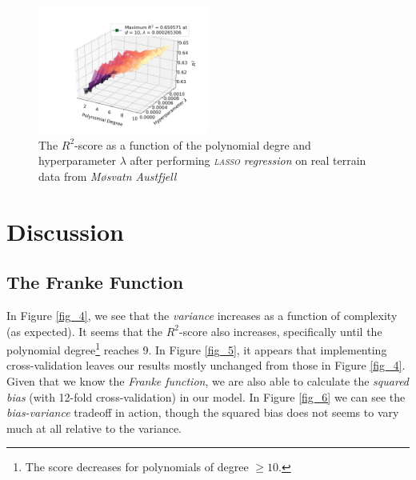 \documentclass[a4paper,10pt,english]{article}
\begin{document}
\begin{multicols*}{2}
\begin{figure}[H]
	\centering 
	\includegraphics[width = 0.5\textwidth, center]{../real_output/part_E_3.png}
	\caption{The $R^2$-score as a function of the polynomial degre and hyperparameter $\lambda$ after performing \textit{\textsc{lasso} regression} on real terrain data from \textit{Møsvatn Austfjell}}
	\label{fig_24}
\end{figure}

\section*{Discussion}
\label{sec:discussion}

\subsection*{The Franke Function}

In Figure \ref{fig_4}, we see that the \textit{variance} increases as a function of complexity (as expected). It seems that the $R^2$-score also increases, specifically until the polynomial degree\footnote{The score decreases for polynomials of degree $\geq 10$.} reaches 9. In Figure \ref{fig_5}, it appears that implementing cross-validation leaves our results mostly unchanged from those in Figure \ref{fig_4}. Given that we know the \textit{Franke function}, we are also able to calculate the \textit{squared bias} (with 12-fold cross-validation) in our model.  In Figure \ref{fig_6} we can see the \textit{bias-variance} tradeoff in action, though the squared bias does not seems to vary much at all relative to the variance.


\end{multicols*}
\end{document}
